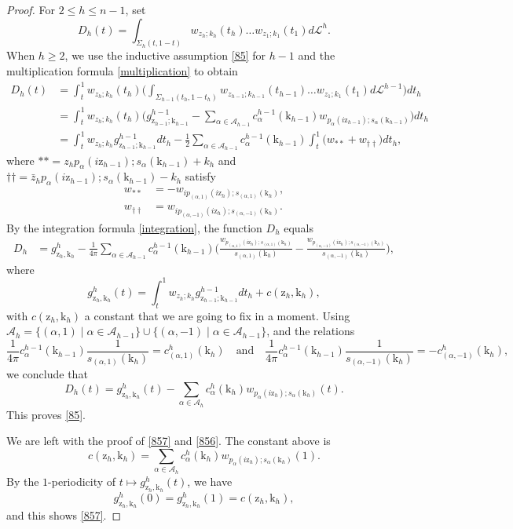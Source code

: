 \documentclass[12pt, reqno]{amsart}
\theoremstyle{plain}
\theoremstyle{definition}
\theoremstyle{remark}
\numberwithin{equation}{section}
\renewcommand{\L}{\mathcal{L}}
\newcommand{\A}{\mathcal{A}}
\newcommand{\0}{\theta}
\renewcommand{\a}{\alpha}
\renewcommand{\k}{\kappa}
\newcommand{\z}{\zeta}
\newcommand{\1}{{-1}}
\renewcommand{\=}{\coloneqq}
\renewcommand{\.}{\dots}
\newcommand{\mc}{\mathcal}
\newcommand{\be}{\begin{equation}}
\newcommand{\ee}{\end{equation}}
\renewcommand{\A}{\mc A}
\renewcommand{\z}{\mathrm z}
\renewcommand{\k}{\mathrm k}
\begin{document}
\begin{proof}
 
 For $2\leq h\leq n-1$, set
 \[
 D_h(t)=
  \int_{\Sigma_h(t,1-t)}w_{z_h;k_h}(t_h) \.w_{z_1;k_1}(t_1) d\L^{h}.
 \]
 When $h\geq2$, we use the inductive assumption \eqref{85} for $h-1$  and  the multiplication formula \eqref{multiplication}  
 to obtain 
 \begin{align*}
 D_h(t) & =\int_t^{1} w_{z_h;k_h}(t_h)
  \Big(\int_{\Sigma_{h-1} (t_h,1-t_h)}w_{z_{h-1} ;k_{h-1}}(t_{h-1}) \.w_{z_1;k_1}(t_1) d\L^{h-1}\Big)dt_h
 \\
  &=\int_t^1w_{z_h;k_h}(t_h) \Big(g^{h-1}_{\z_{h-1};\k_{h-1}}-
  \sum_{\a\in\A_{h-1}}c_\a^{h-1} (\k_{h-1}) w_{p_\a(i\z_{h-1});s_\a(\k_{h-1})}  \Big)dt_h\\
  &=\int_t^1  w_{z_h;k_h}g^{h-1}_{\z_{h-1};\k_{h-1}} dt_h -\frac12
  \sum_{\a\in\A_{h-1}}c_\a^{h-1}(\k_{h-1})  \int_t^1  \big(w_{**}+w_{\dagger\dagger}\big) dt_h,
 \end{align*}
 where  $**=z_hp_\a(i\z_{h-1});s_\a(\k_{h-1})+k_h$ and $\dagger\dagger=\bar z_h p_\a(i\z_{h-1});s_\a(\k_{h-1})-k_h$ satisfy 
  \[
 \begin{split}
  w_{** }& =%
  -w_{ip_{(\a,1)}(i\z_h);s_{(\a,1)}(\k_h)},
\\
  w_{\dagger\dagger}&=w_{ip_{(\a,-1)}(i\z_h);s_{(\a,-1)}(\k_h)}.
  \end{split}
 \]
 By the integration formula \eqref{integration},  the function $D_h$ equals  
  \[
 \begin{split}
 D_h& = g^h_{\z_h,\k_h}-\frac{1}{4\pi} 
  \sum_{\a\in\A_{h-1}}c_\a^{h-1}(\k_{h-1} ) \Big(\frac{w_{p_{(\a,1)}(i\z_h);s_{(\a,1)}(\k_h)}}{s_{(\a,1)}(\k_h)}-\frac{w_{p_{(\a,-1)}(i\z_h);s_{(\a,-1)}(\k_h)}}{s_{(\a,-1)}(\k_h)}\Big),
 \end{split}
 \]
 where
 \be\label{ciccio}
g^h_{\z_h,\k_h}(t)=  \int_t^1 w_{z_h;k_h}g^{h-1}_{\z_{h-1};\k_{h-1}}dt_h +c(\z_h,\k_h),
\ee
with $c(\z_h,\k_h)$ a constant that we are going to fix in a moment.
Using  $
  \A_{h}=\{(\a,1)\mid \a\in\A_{h-1}\}\cup\{(\a,-1)\mid \a\in\A_{h-1}\}$, and
  the relations  
 \[
  \frac{1}{4\pi}c_\a^{h-1}(\k_{h-1})\frac{1}{s_{(\a,1)}(\k_h)}=c_{(\a,1)}^h(\k_h)
   \quad \text{and} \quad 
   \frac{1}{4\pi}c_\a^{h-1}(\k_{h-1})\frac{1}{s_{(\a,-1)}(\k_h)}=-c_{(\a,-1)}^h(\k_h),
 \]
 we conclude that 
 \[
 D_h(t) =  g^h_{\z_h,\k_h}(t)-
  \sum_{\a\in\A_{h} }c_\a^h (\k_h) w_{p_\a(i\z_h);s_\a(\k_h)}(t).
 \]
 This proves \eqref{85}.
 
 We are left with the proof of \eqref{857} and \eqref{856}.
 The constant above is 
 \[
 c(\z_h,\k_h)=
  \sum_{\a\in\A_{h} }c_\a^h (\k_h) w_{p_\a(i\z_h);s_\a(\k_h)}(1).
  \]
  By the $1$-periodicity of $t\mapsto g^h_{\z_h,\k_h}(t)$, we have
  \[
g^h_{\z_h,\k_h}(0)= g^h_{\z_h,\k_h}(1) =c(\z_h,\k_h),
  \]
  and this shows \eqref{857}. 
  

\end{proof}
\end{document}
